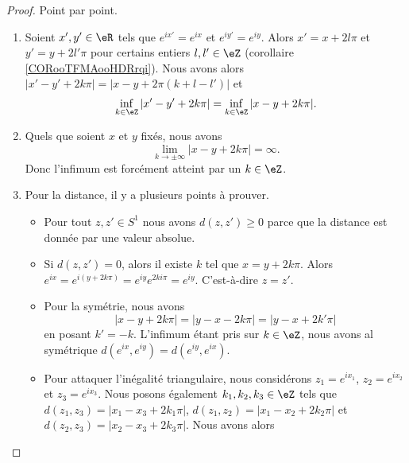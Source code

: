 \begin{proof}
    Point par point.
    \begin{enumerate}
        \item
            Soient \( x',y'\in \eR\) tels que \(  e^{ix'}= e^{ix}\) et \(  e^{iy'}= e^{iy}\). Alors \( x'=x+2l\pi\) et \( y'=y+2l'\pi\) pour certains entiers \( l,l'\in \eZ\) (corollaire \ref{CORooTFMAooHDRrqi}). Nous avons alors \( | x'-y'+2k\pi |=| x-y+2\pi(k+l-l') |\) et
            \begin{equation}
                \inf_{k\in \eZ}| x'-y'+2k\pi |=\inf_{k\in \eZ}| x-y+2k\pi |.
            \end{equation}
        \item
            Quels que soient \( x\) et \( y\) fixés, nous avons
            \begin{equation}
                \lim_{k\to \pm\infty} | x-y+2k\pi |=\infty.
            \end{equation}
            Donc l'infimum est forcément atteint par un \( k\in \eZ\).
        \item
            Pour la distance, il y a plusieurs points à prouver. 
            \begin{itemize}
                \item 
                    Pour tout \( z,z'\in S^1\) nous avons \( d(z,z')\geq 0\) parce que la distance est donnée par une valeur absolue.
                \item
                    Si \( d(z,z')=0\), alors il existe \( k\) tel que \( x=y+2k\pi\). Alors \(  e^{ix}= e^{i(y+2k\pi)}= e^{iy} e^{2ki\pi}= e^{iy}\). C'est-à-dire \( z=z'\).
                \item
                    Pour la symétrie, nous avons
                    \begin{equation}
                        | x-y+2k\pi |=| y-x-2k\pi |=| y-x+2k'\pi |
                    \end{equation}
                    en posant \( k'=-k\). L'infimum étant pris sur \( k\in \eZ\), nous avons al symétrique \( d( e^{ix},  e^{iy})=d( e^{iy}, e^{ix})\).
                \item
                    Pour attaquer l'inégalité triangulaire, nous considérons \( z_1= e^{ix_1}\), \( z_2= e^{ix_2}\) et \( z_3= e^{ix_3}\). Nous posons également \( k_1,k_2, k_3\in \eZ\) tels que \( d(z_1,z_3)=| x_1-x_3+2k_1\pi | \), \( d(z_1,z_2)=| x_1-x_2+2k_2\pi |\) et \( d(z_2,z_3)=| x_2-x_3+2k_3\pi |\). Nous avons alors
                    \begin{subequations}

\end{subequations}
\end{itemize}
\end{enumerate}
\end{proof}
